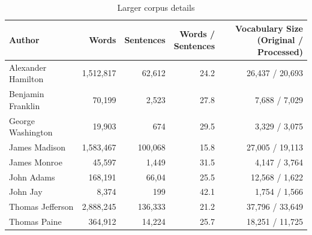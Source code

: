 \documentclass[11pt]{article}
\begin{document}
\begin{table}[t]
	\centering
	\begin{tabular}{lrrrr}
	\toprule
	\bf Author&   \bf Words & \bf Sentences & \bf \thead{Words /\\ Sentences} & \bf \thead{Vocabulary Size\\ (Original / Processed)} \\
	\midrule
	Alexander Hamilton &  1,512,817 &     62,612 &        24.2 & 26,437 / 20,693 \\
	Benjamin Franklin  &    70,199 &      2,523 &        27.8 &   7,688 / 7,029 \\
	George Washington  &    19,903 &       674 &        29.5 &   3,329 / 3,075 \\
	James Madison      &  1,583,467 &    100,068 &        15.8 & 27,005 / 19,113 \\
	James Monroe       &    45,597 &      1,449 &        31.5 &   4,147 / 3,764 \\
	John Adams         &   168,191 &      66,04 &        25.5 &  12,568 / 1,622 \\
	John Jay           &     8,374 &       199 &        42.1 &   1,754 / 1,566 \\
	Thomas Jefferson   &  2,888,245 &    136,333 &        21.2 & 37,796 / 33,649 \\
	Thomas Paine       &   364,912 &     14,224 &        25.7 & 18,251 / 11,725 \\
	\bottomrule
	\end{tabular}
	\caption{\label{corpus} Larger corpus details}
\end{table}
\end{document}
